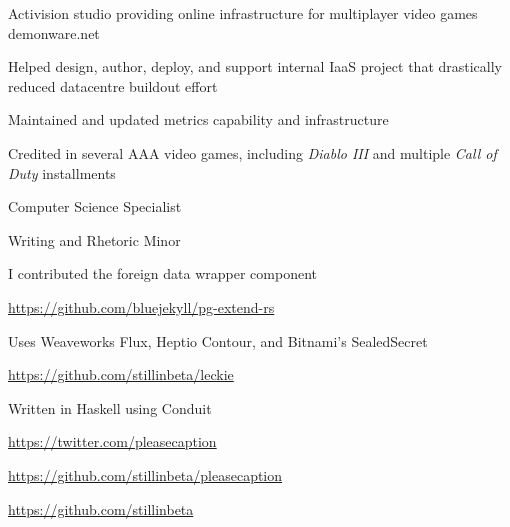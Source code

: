 \documentclass[letterpaper,11pt,notitlepage]{article}
\begin{document}
    \companydescurl
       {Activision studio providing online infrastructure for multiplayer video
         games}
       {demonware.net} \\
    \begin{employment}
        \item Helped design, author, deploy, and support internal IaaS
              project that drastically reduced datacentre buildout effort
        \item Maintained and updated metrics capability and infrastructure
        \item Credited in several AAA video games, including
          {\it Diablo III} and multiple {\it Call of Duty} installments
    \end{employment}
\vbar{}
    \begin{employment}
        \item Computer Science Specialist
        \item Writing and Rhetoric Minor
    \end{employment}

\newpage
{}
    \begin{employment}
      \item I contributed the foreign data wrapper component
      \item \url{https://github.com/bluejekyll/pg-extend-rs}
    \end{employment}
    \begin{employment}
      \item Uses Weaveworks Flux, Heptio Contour, and Bitnami's SealedSecret
      \item \url{https://github.com/stillinbeta/leckie}
    \end{employment}
    \begin{employment}
      \item Written in Haskell using Conduit
      \item \url{https://twitter.com/pleasecaption}
      \item \url{https://github.com/stillinbeta/pleasecaption}
    \end{employment}
        \begin{employment}
           \item \url{https://github.com/stillinbeta}
        \end{employment}
\vbar
\end{document}
